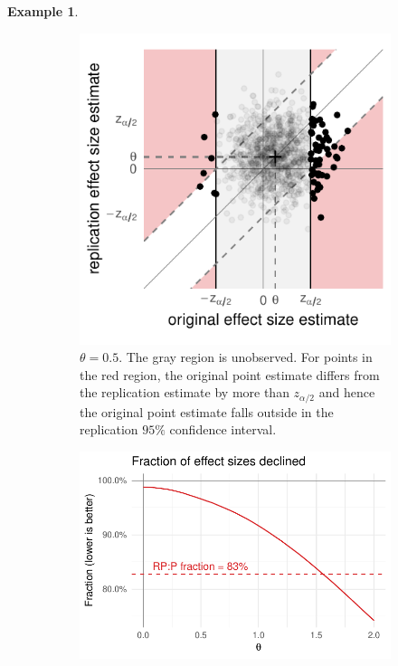 \documentclass[11pt]{article}
\theoremstyle{definition}
\newtheorem{example}{Example}
\theoremstyle{custom}
\begin{document}
\begin{example}
\begin{figure}[htbp]
\begin{subfigure}[t]{0.39\hsize}
	      \includegraphics[width=\hsize]{naive-ci-theta05}
	      \caption{$\theta = 0.5$. The gray region is unobserved. For points in the red region, the original point estimate differs from the replication estimate by more than $z_{\alpha/2}$ and hence the original point estimate falls outside in the replication $95\%$ confidence interval.}
	    \label{fig:naive-ci-theta05}
	    \end{subfigure}
	    \caption{}
	  \label{fig:naive-ci-sim}
	  \end{figure}
	  \begin{figure}[htbp]
	    \centering
	    \begin{subfigure}[t]{0.59\hsize}
	      \centering
	      \includegraphics[width=\hsize]{naive-decline}

\end{subfigure}
\end{figure}
\end{example}
\end{document}
